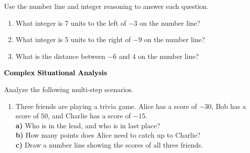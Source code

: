 \documentclass[12pt, letterpaper, fleqn]{article}
\newcommand{\blank}{\underline{\hspace{2.2cm}}}
\newcommand{\blanklong}{\underline{\hspace{6.5cm}}}
\begin{document}
\noindent
Use the number line and integer reasoning to answer each question.

\vspace{3mm}
\begin{enumerate}[itemsep=2.2cm, leftmargin=0.6cm]
\item What integer is 7 units to the left of $-3$ on the number line? \blank

\vspace{2cm}

\item What integer is 5 units to the right of $-9$ on the number line? \blank

\vspace{2cm}

\item What is the distance between $-6$ and $4$ on the number line? \blank

\vspace{2cm}

\end{enumerate}

\newpage

\begin{tcolorbox}[colback=black!10]
\large\textcolor{black}{\textbf{Complex Situational Analysis}}
\end{tcolorbox}

\noindent
Analyze the following multi-step scenarios.

\vspace{3mm}
\begin{enumerate}[itemsep=2.3cm, leftmargin=0.6cm]
\item Three friends are playing a trivia game. Alice has a score of $-30$, Bob has a score of $50$, and Charlie has a score of $-15$. \\
\textbf{a)} Who is in the lead, and who is in last place? \blanklong \\
\textbf{b)} How many points does Alice need to catch up to Charlie? \blanklong \\
\textbf{c)} Draw a number line showing the scores of all three friends.

\vspace{2.2cm}

\end{enumerate}

\newpage
\end{document}
